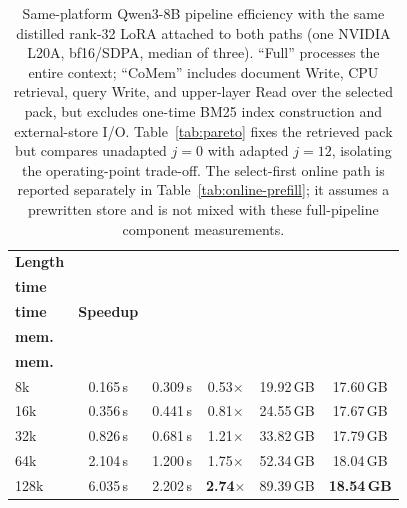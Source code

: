 \begin{table}[!t]
\centering
\footnotesize
\setlength{\tabcolsep}{4pt}
\begin{tabular}{@{}lccccc@{}}
\toprule
\textbf{Length} & \shortstack{\textbf{Full}\\\textbf{time}} & \shortstack{\textbf{CoMem}\\\textbf{time}} & \textbf{Speedup} & \shortstack{\textbf{Full}\\\textbf{mem.}} & \shortstack{\textbf{CoMem}\\\textbf{mem.}} \\
\midrule
8k   & 0.165\,s & 0.309\,s & 0.53$\times$ & 19.92\,GB & 17.60\,GB \\
16k  & 0.356\,s & 0.441\,s & 0.81$\times$ & 24.55\,GB & 17.67\,GB \\
32k  & 0.826\,s & 0.681\,s & 1.21$\times$ & 33.82\,GB & 17.79\,GB \\
64k  & 2.104\,s & 1.200\,s & 1.75$\times$ & 52.34\,GB & 18.04\,GB \\
128k & 6.035\,s & 2.202\,s & \textbf{2.74$\times$} & 89.39\,GB & \textbf{18.54\,GB} \\
\bottomrule
\end{tabular}
\caption{Same-platform Qwen3-8B pipeline efficiency with the same distilled rank-32 LoRA
attached to both paths (one NVIDIA L20A, bf16/SDPA, median of three). ``Full''
processes the entire context; ``CoMem'' includes document Write, CPU retrieval,
query Write, and upper-layer Read over the selected pack, but excludes one-time
BM25 index construction and external-store I/O. Table~\ref{tab:pareto} fixes the
retrieved pack but compares unadapted $j{=}0$ with adapted $j{=}12$, isolating
the operating-point trade-off. The select-first online path is reported
separately in Table~\ref{tab:online-prefill}; it assumes a prewritten store and
is not mixed with these full-pipeline component measurements.}
\label{tab:eff}
\end{table}

